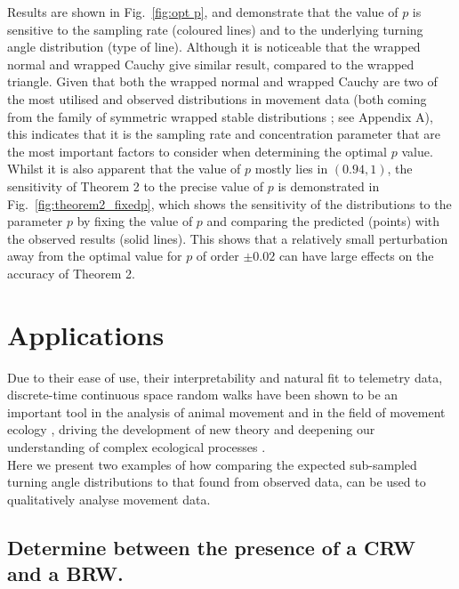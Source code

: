 \documentclass[english]{article}
\begin{document}
Results are shown in Fig.~\ref{fig:opt p}, and demonstrate that the value of $p$ is sensitive to the sampling rate (coloured lines) and to the underlying turning angle distribution (type of line).  Although it is noticeable that the wrapped normal and wrapped Cauchy give similar result, compared to the wrapped triangle.  Given that both the wrapped normal and wrapped Cauchy are two of the most utilised and observed distributions in movement data (both coming from the family of symmetric wrapped stable distributions \citep{jammalamadaka2001topics}; see Appendix A), this indicates that it is the sampling rate and concentration parameter that are the most important factors to consider when determining the optimal $p$ value.  Whilst it is also apparent that the value of $p$ mostly lies in $(0.94,1)$, the sensitivity of Theorem 2 to the precise value of $p$ is demonstrated in Fig.~\ref{fig:theorem2_fixedp}, which shows the sensitivity of the distributions to the parameter $p$ by fixing the value of $p$ and comparing the predicted (points) with the observed results (solid lines).  This shows that a relatively small perturbation away from the optimal value for $p$ of order $\pm0.02$ can have large effects on the accuracy of Theorem 2.


\section{Applications}
Due to their ease of use, their interpretability and natural fit to telemetry data, discrete-time continuous space random walks have been shown to be an important tool in the analysis of animal movement and in the field of movement ecology \citep{kareiva1983analyzing,nathan2008movement,codling2008random,bailey2018navigational,ModelingandDataAnalysisinMovementEcology}, driving the development of new theory \citep{codling2008random,smouse2010stochastic,lutscher2021correlated} and deepening our understanding of complex ecological processes \citep{berg1993random,hooten2017animal,lewis2013dispersal}.\\
Here we present two examples of how comparing the expected sub-sampled turning angle distributions to that found from observed data, can be used to qualitatively analyse movement data. 

\subsection{Determine between the presence of a CRW and a BRW.}
\end{document}
